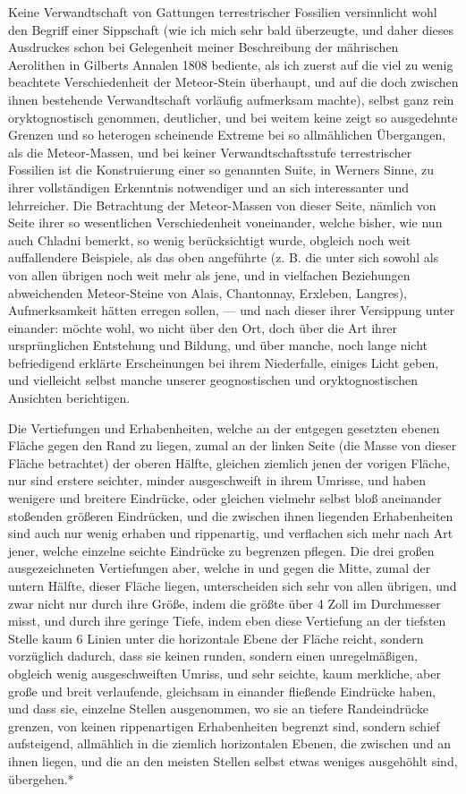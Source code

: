 \documentclass[a4paper, 11pt, oneside, german]{article}
\begin{document}
Keine Verwandtschaft von Gattungen terrestrischer Fossilien versinnlicht wohl den Begriff einer Sippschaft (wie ich mich sehr bald überzeugte, und daher dieses Ausdruckes schon bei Gelegenheit meiner Beschreibung der mährischen Aerolithen in Gilberts Annalen 1808 bediente, als ich zuerst auf die viel zu wenig beachtete Verschiedenheit der Meteor-Stein überhaupt, und auf die doch zwischen ihnen bestehende Verwandtschaft vorläufig aufmerksam machte), selbst ganz rein oryktognostisch genommen, deutlicher, und bei weitem keine zeigt so ausgedehnte Grenzen und so heterogen scheinende Extreme bei so allmählichen Übergangen, als die Meteor-Massen, und bei keiner Verwandtschaftsstufe terrestrischer Fossilien ist die Konstruierung einer so genannten Suite, in Werners Sinne, zu ihrer vollständigen Erkenntnis notwendiger und an sich interessanter und lehrreicher.  
Die Betrachtung der Meteor-Massen von dieser Seite, nämlich von Seite ihrer so wesentlichen Verschiedenheit voneinander, welche bisher, wie nun auch Chladni bemerkt, so wenig berücksichtigt wurde, obgleich noch weit auffallendere Beispiele, als das oben angeführte (z. B. die unter sich sowohl als von allen übrigen noch weit mehr als jene, und in vielfachen Beziehungen abweichenden Meteor-Steine von Alais, Chantonnay, Erxleben, Langres), Aufmerksamkeit hätten erregen sollen, --- und nach dieser ihrer Versippung unter einander: möchte wohl, wo nicht über den Ort, doch über die Art ihrer ursprünglichen Entstehung und Bildung, und über manche, noch lange nicht befriedigend erklärte Erscheinungen bei ihrem Niederfalle, einiges Licht geben, und vielleicht selbst manche unserer geognostischen und oryktognostischen Ansichten berichtigen.

Die Vertiefungen und Erhabenheiten, welche an der entgegen gesetzten ebenen Fläche gegen den Rand zu liegen, zumal an der linken Seite (die Masse von dieser Fläche betrachtet) der oberen Hälfte, gleichen ziemlich jenen der vorigen Fläche, nur sind erstere seichter, minder ausgeschweift in ihrem Umrisse, und haben wenigere und breitere Eindrücke, oder gleichen vielmehr selbst bloß aneinander stoßenden größeren Eindrücken, und die zwischen ihnen liegenden Erhabenheiten sind auch nur wenig erhaben und rippenartig, und verflachen sich mehr nach Art jener, welche einzelne seichte Eindrücke zu begrenzen pflegen. Die drei großen ausgezeichneten Vertiefungen aber, welche in und gegen die Mitte, zumal der untern Hälfte, dieser Fläche liegen, unterscheiden sich sehr von allen übrigen, und zwar nicht nur durch ihre Größe, indem die größte über 4 Zoll im Durchmesser misst, und durch ihre geringe Tiefe, indem eben diese Vertiefung an der tiefsten Stelle kaum 6 Linien unter die horizontale Ebene der Fläche reicht, sondern vorzüglich dadurch, dass sie keinen runden, sondern einen unregelmäßigen, obgleich wenig ausgeschweiften Umriss, und sehr seichte, kaum merkliche, aber große und breit verlaufende, gleichsam in einander fließende Eindrücke haben, und dass sie, einzelne Stellen ausgenommen, wo sie an tiefere Randeindrücke grenzen, von keinen rippenartigen Erhabenheiten begrenzt sind, sondern schief aufsteigend, allmählich in die ziemlich horizontalen Ebenen, die zwischen und an ihnen liegen, und die an den meisten Stellen selbst etwas weniges ausgehöhlt sind, übergehen.*
\end{document}

